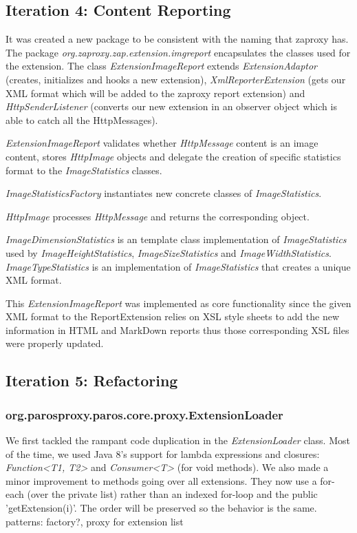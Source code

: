 \subsection{Iteration 4: Content Reporting}
It was created a new package to be consistent with the naming that zaproxy has. The package \textit{org.zaproxy.zap.extension.imgreport} encapsulates the classes used for the extension. The class \textit{ExtensionImageReport} extends \textit{ExtensionAdaptor} (creates, initializes and hooks a new extension), \textit{XmlReporterExtension} (gets our XML format which will be added to the zaproxy report extension) and \textit{HttpSenderListener} (converts our new extension in an observer object which is able to catch all the HttpMessages).
\par
\textit{ExtensionImageReport} validates whether \textit{HttpMessage} content is an image content, stores \textit{HttpImage} objects and delegate the creation of specific statistics format to the \textit{ImageStatistics} classes. 
\par
\textit{ImageStatisticsFactory} instantiates new concrete classes of \textit{ImageStatistics}.
\par
\textit{HttpImage} processes \textit{HttpMessage} and returns the corresponding object.
\par
\textit{ImageDimensionStatistics} is an template class implementation of \textit{ImageStatistics} used by \textit{ImageHeightStatistics}, \textit{ImageSizeStatistics} and \textit{ImageWidthStatistics}. \textit{ImageTypeStatistics} is an implementation of \textit{ImageStatistics} that creates a unique XML format.
\par
This \textit{ExtensionImageReport} was implemented as core functionality since the given XML format to the ReportExtension relies on XSL style sheets to add the new information in HTML and MarkDown reports thus those corresponding XSL files were properly updated.

\subsection{Iteration 5: Refactoring}
\subsubsection{org.parosproxy.paros.core.proxy.ExtensionLoader}
We first tackled the rampant code duplication in  the \textit{ExtensionLoader} class. Most of the time, we used Java 8's support for lambda expressions and closures: \textit{Function<T1, T2>} and \textit{Consumer<T>} (for void methods).
We also made a minor improvement to methods going over all extensions. They now use a for-each (over the private list) rather than an indexed for-loop and the public 'getExtension(i)'. The order will be preserved so the behavior is the same.
patterns: factory?, proxy for extension list
